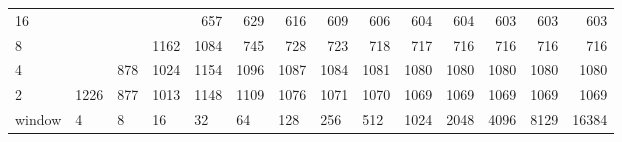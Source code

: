 \begin{table}[h]
{\begin{tabular}{lrrrrrrrrrrrrr}
			\multicolumn{1}{|l|}{16} &  &  &  & \cellcolor[HTML]{E60000}657 & \cellcolor[HTML]{E60000}629 & \cellcolor[HTML]{E60000}616 & \cellcolor[HTML]{E60000}609 & \cellcolor[HTML]{E60000}606 & \cellcolor[HTML]{E60000}604 & \cellcolor[HTML]{E60000}604 & \cellcolor[HTML]{E60000}603 & \cellcolor[HTML]{E60000}603 & \cellcolor[HTML]{E60000}603 \\ \cline{1-1}
			\multicolumn{1}{|l|}{8} &  &  & \cellcolor[HTML]{4C00E6}1162 & \cellcolor[HTML]{4C00E6}1084 & \cellcolor[HTML]{E60000}745 & \cellcolor[HTML]{E60000}728 & \cellcolor[HTML]{E60000}723 & \cellcolor[HTML]{E60000}718 & \cellcolor[HTML]{E60000}717 & \cellcolor[HTML]{E60000}716 & \cellcolor[HTML]{E60000}716 & \cellcolor[HTML]{E60000}716 & \cellcolor[HTML]{E60000}716 \\ \cline{1-1}
			\multicolumn{1}{|l|}{4} &  & \cellcolor[HTML]{9900E6}878 & \cellcolor[HTML]{4C00E6}1024 & \cellcolor[HTML]{4C00E6}1154 & \cellcolor[HTML]{4C00E6}1096 & \cellcolor[HTML]{4C00E6}1087 & \cellcolor[HTML]{4C00E6}1084 & \cellcolor[HTML]{4C00E6}1081 & \cellcolor[HTML]{4C00E6}1080 & \cellcolor[HTML]{4C00E6}1080 & \cellcolor[HTML]{4C00E6}1080 & \cellcolor[HTML]{4C00E6}1080 & \cellcolor[HTML]{4C00E6}1080 \\ \cline{1-1}
			\multicolumn{1}{|l|}{2} & \cellcolor[HTML]{4C00E6}1226 & \cellcolor[HTML]{9900E6}877 & \cellcolor[HTML]{4C00E6}1013 & \cellcolor[HTML]{4C00E6}1148 & \cellcolor[HTML]{4C00E6}1109 & \cellcolor[HTML]{4C00E6}1076 & \cellcolor[HTML]{4C00E6}1071 & \cellcolor[HTML]{4C00E6}1070 & \cellcolor[HTML]{4C00E6}1069 & \cellcolor[HTML]{4C00E6}1069 & \cellcolor[HTML]{4C00E6}1069 & \cellcolor[HTML]{4C00E6}1069 & \cellcolor[HTML]{4C00E6}1069 \\ \cline{1-1}
			\multicolumn{1}{l|}{window} & \multicolumn{1}{l|}{4} & \multicolumn{1}{l|}{8} & \multicolumn{1}{l|}{16} & \multicolumn{1}{l|}{32} & \multicolumn{1}{l|}{64} & \multicolumn{1}{l|}{128} & \multicolumn{1}{l|}{256} & \multicolumn{1}{l|}{512} & \multicolumn{1}{l|}{1024} & \multicolumn{1}{l|}{2048} & \multicolumn{1}{l|}{4096} & \multicolumn{1}{l|}{8129} & \multicolumn{1}{l|}{16384} \\ \cline{2-14} 
		\end{tabular}
	}
\end{table}


